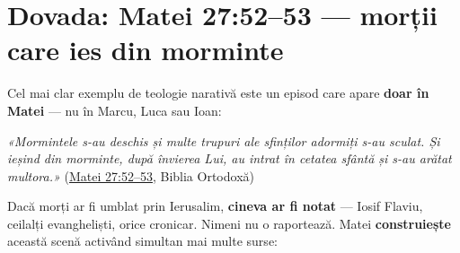 \documentclass[12pt,a4paper,twoside,openany]{book}
\begin{document}
\chapter{Dovada: Matei 27:52–53 — morții care ies din morminte}\label{dovada-matei}
Cel mai clar exemplu de teologie narativă este un episod care apare \textbf{doar în Matei} — nu în Marcu, Luca sau Ioan:


\begin{biblequote}
\textit{«Mormintele s-au deschis și multe trupuri ale sfinților adormiți s-au sculat. Și ieșind din morminte, după învierea Lui, au intrat în cetatea sfântă și s-au arătat multora.»} (\href{https://bibliaortodoxa.ro/carte.php?id=55\&cap=27\#52}{Matei 27:52–53}, Biblia Ortodoxă)
\end{biblequote}
Dacă morți ar fi umblat prin Ierusalim, \textbf{cineva ar fi notat} — Iosif Flaviu, ceilalți evangheliști, orice cronicar. Nimeni nu o raportează. Matei \textbf{construiește} această scenă activând simultan mai multe surse:
\end{document}
